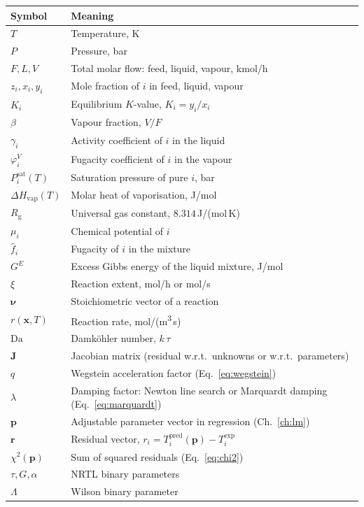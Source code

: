 \documentclass[11pt,a4paper]{article}
\newcommand{\Rgas}{R_{\!\mathrm{g}}}                %
\newcommand{\Psat}{P^{\mathrm{sat}}}
\newcommand{\Hvap}{\Delta H_{\!\mathrm{vap}}}
\newcommand{\Gex}{G^{E}}
\newcommand{\xv}{\mathbf{x}}
\newcommand{\Jac}{\mathbf{J}}
\newcommand{\pv}{\mathbf{p}}                          %
\newcommand{\rv}{\mathbf{r}}                          %
\begin{document}
\begin{center}\small
\begin{tabularx}{\linewidth}{@{}lX@{}}
\toprule
\textbf{Symbol}            & \textbf{Meaning} \\
\midrule
$T$                         & Temperature, K \\
$P$                         & Pressure, bar \\
$F, L, V$                   & Total molar flow: feed, liquid, vapour, kmol/h \\
$z_i, x_i, y_i$             & Mole fraction of $i$ in feed, liquid, vapour \\
$K_i$                       & Equilibrium $K$-value, $K_i = y_i / x_i$ \\
$\beta$                     & Vapour fraction, $V/F$ \\
$\gamma_i$                  & Activity coefficient of $i$ in the liquid \\
$\varphi_i^V$               & Fugacity coefficient of $i$ in the vapour \\
$\Psat_i(T)$                & Saturation pressure of pure $i$, bar \\
$\Hvap(T)$                  & Molar heat of vaporisation, J/mol \\
$\Rgas$                     & Universal gas constant, $8.314$\,J/(mol\,K) \\
$\mu_i$                     & Chemical potential of $i$ \\
$\hat f_i$                  & Fugacity of $i$ in the mixture \\
$\Gex$                      & Excess Gibbs energy of the liquid mixture, J/mol \\
$\xi$                       & Reaction extent, mol/h or mol/s \\
$\boldsymbol\nu$            & Stoichiometric vector of a reaction \\
$r(\xv, T)$                 & Reaction rate, mol/(m\textsuperscript{3}\,s) \\
$\mathrm{Da}$               & Damk\"ohler number, $k\,\tau$ \\
$\Jac$                      & Jacobian matrix (residual w.r.t.\ unknowns or w.r.t.\ parameters) \\
$q$                         & Wegstein acceleration factor (Eq.~\ref{eq:wegstein}) \\
$\lambda$                   & Damping factor: Newton line search or Marquardt damping (Eq.~\ref{eq:marquardt}) \\
$\pv$                       & Adjustable parameter vector in regression (Ch.~\ref{ch:lm}) \\
$\rv$                       & Residual vector, $r_i = T^{\mathrm{pred}}_i(\pv) - T^{\mathrm{exp}}_i$ \\
$\chi^2(\pv)$               & Sum of squared residuals (Eq.~\ref{eq:chi2}) \\
$\tau, G, \alpha$           & NRTL binary parameters \\
$\Lambda$                   & Wilson binary parameter \\
\bottomrule
\end{tabularx}
\end{center}
\end{document}
